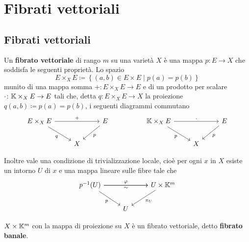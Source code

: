 \chapter{Fibrati vettoriali}

\section{Fibrati vettoriali}
\begin{definition}
    Un \textbf{fibrato vettoriale} di rango $m$ su una varietà $X$ è una mappa $p\colon E \to X$ che soddisfa le seguenti proprietà. Lo spazio 
    \[E \times_X E \coloneqq \left\{(a,b)\in E \times E \mid p(a)=p(b)\right\}\] 
    munito di una mappa somma $+\colon E\times_X E \to E$ e di un prodotto per scalare $\cdot \colon \mathbb{K}\times_X E \to E$ tali che, detta $q\colon E \times_X E \to X$ la proiezione $q(a,b)\coloneqq p(a)=p(b)$, i seguenti diagrammi commutano 
\[\begin{tikzcd}
	{ E\times_X E} && E && { \K\times_X E} && E \\
	& X &&&& X
	\arrow["{+}", from=1-1, to=1-3]
	\arrow["q"', from=1-1, to=2-2]
	\arrow["p", from=1-3, to=2-2]
	\arrow["\cdot", from=1-5, to=1-7]
	\arrow["p"', from=1-5, to=2-6]
	\arrow["p", from=1-7, to=2-6]
\end{tikzcd}\]

Inoltre vale una condizione di trivializzazione locale, cio\`e per ogni $x$ in $X$ esiste un intorno $U$ di $x$ e una mappa lineare sulle fibre tale che 
\[\begin{tikzcd}
	{p^{-1}(U)} && {U\times \K^m} \\
	& U
	\arrow["\sim"', from=1-1, to=1-3]
	\arrow["\varphi", from=1-1, to=1-3]
	\arrow["p"', from=1-1, to=2-2]
	\arrow["{\pi_U}", from=1-3, to=2-2]
\end{tikzcd}\]
\end{definition}

\begin{example}
    $X\times \mathbb{K}^m$ con la mappa di proiezione su $X$ \`e un fibrato vettoriale, detto \textbf{fibrato banale}. 
\end{example}

